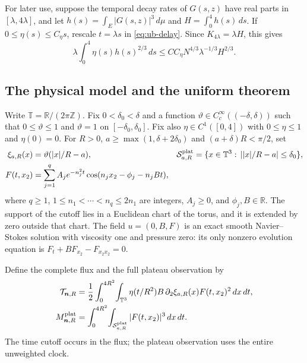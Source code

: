 For later use, suppose the temporal decay rates of $G(s,z)$ have real
parts in $[\lambda,4\lambda]$, and let
$h(s)=\int_E|G(s,z)|^3\,d\mu$ and $H=\int_0^4h(s)\,ds$.
If $0\le\eta(s)\le C_\eta s$, rescale $t=\lambda s$ in
\eqref{eq:ub-delay}.  Since $K_{4\lambda}=\lambda H$, this gives
\begin{equation}\label{eq:ub-cutoff-time}
 \lambda\int_0^4\eta(s)h(s)^{2/3}\,ds
 \le C C_\eta N^{4/3}\lambda^{-1/3}H^{2/3}.
\end{equation}

\subsection{The physical model and the uniform theorem}

Write $\mathbb T=\mathbb R/(2\pi\mathbb Z)$.  Fix
$0<\delta_0<\delta$ and a function
$\vartheta\in C_c^\infty((-\delta,\delta))$ such that
$0\le\vartheta\le1$ and $\vartheta=1$ on $[-\delta_0,\delta_0]$.
Fix also $\eta\in C^1([0,4])$ with
$0\le\eta\le1$ and $\eta(0)=0$.
For $R>0$, $a\ge\max(1,\delta+2\delta_0)$ and $(a+\delta)R<\pi/2$, set
\begin{align}
 \xi_{a,R}(x)&=\vartheta(|x|/R-a),&
 \mathcal S^{\rm plat}_{a,R}
 &=\{x\in\mathbb T^3:\,||x|/R-a|\le\delta_0\},
 \label{eq:ub-geometry}\\
 F(t,x_2)&=\sum_{j=1}^q A_je^{-n_j^2t}
                   \cos(n_jx_2-\phi_j-n_jBt),
 \label{eq:ub-F}
\end{align}
where $q\ge1$, $1\le n_1<\cdots<n_q\le2n_1$ are integers,
$A_j\ge0$, and $\phi_j,B\in\mathbb R$.
The support of the cutoff lies in a Euclidean chart of the torus, and it
is extended by zero outside that chart.  The field $u=(0,B,F)$ is an exact
smooth Navier--Stokes solution with viscosity one and pressure zero:
its only nonzero evolution equation is
$F_t+BF_{x_2}-F_{x_2x_2}=0$.

Define the complete flux and the full plateau observation by
\begin{align}
 \mathcal T_{\boldsymbol n,R}
 &=\frac12\int_0^{4R^2}\!\int_{\mathbb T^3}
       \eta(t/R^2)B\,\partial_2\xi_{a,R}(x)F(t,x_2)^2\,dx\,dt,
 \label{eq:ub-T}\\
 M^{\rm plat}_{\boldsymbol n,R}
 &=\int_0^{4R^2}\!\int_{\mathcal S^{\rm plat}_{a,R}}
                         |F(t,x_2)|^3\,dx\,dt.
 \label{eq:ub-M}
\end{align}
The time cutoff occurs in the flux; the plateau observation uses the
entire unweighted clock.

